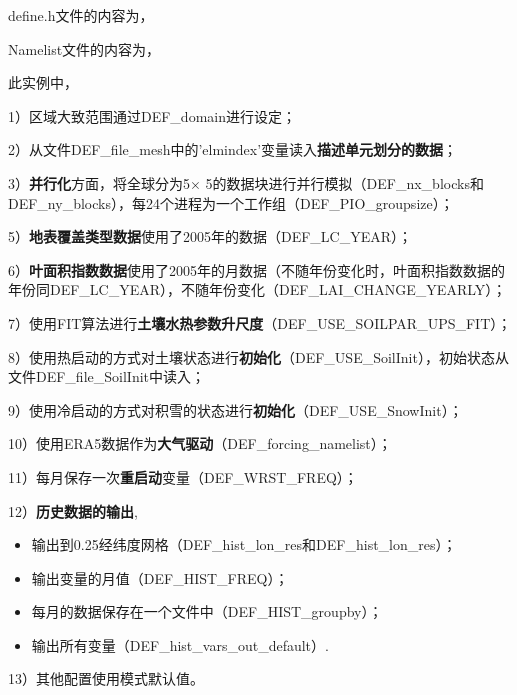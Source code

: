 \documentclass[a4paper,12pt,twoside]{article}
\begin{document}
define.h文件的内容为，


Namelist文件的内容为，


此实例中，\par
1）区域大致范围通过DEF\_domain进行设定；\par
2）从文件DEF\_file\_mesh中的'elmindex'变量读入\textbf{描述单元划分的数据}；\par
3）\textbf{并行化}方面，将全球分为5\textdegree$\times$ 5\textdegree 的数据块进行并行模拟（DEF\_nx\_blocks和DEF\_ny\_blocks），每24个进程为一个工作组（DEF\_PIO\_groupsize）；\par
5）\textbf{地表覆盖类型数据}使用了2005年的数据（DEF\_LC\_YEAR）；\par
6）\textbf{叶面积指数数据}使用了2005年的月数据（不随年份变化时，叶面积指数数据的年份同DEF\_LC\_YEAR），不随年份变化（DEF\_LAI\_CHANGE\_YEARLY）；\par
7）使用FIT算法进行\textbf{土壤水热参数升尺度}（DEF\_USE\_SOILPAR\_UPS\_FIT）；\par
8）使用热启动的方式对土壤状态进行\textbf{初始化}（DEF\_USE\_SoilInit），初始状态从文件DEF\_file\_SoilInit中读入；\par
9）使用冷启动的方式对积雪的状态进行\textbf{初始化}（DEF\_USE\_SnowInit）；\par
10）使用ERA5数据作为\textbf{大气驱动}（DEF\_forcing\_namelist）；\par
11）每月保存一次\textbf{重启动}变量（DEF\_WRST\_FREQ）；\par
12）\textbf{历史数据的输出},
\begin{itemize}[nosep,leftmargin=4em]
    \item 输出到0.25\textdegree 经纬度网格（DEF\_hist\_lon\_res和DEF\_hist\_lon\_res）；
    \item 输出变量的月值（DEF\_HIST\_FREQ）；
    \item 每月的数据保存在一个文件中（DEF\_HIST\_groupby）；
    \item 输出所有变量（DEF\_hist\_vars\_out\_default）.
\end{itemize}\par
13）其他配置使用模式默认值。
\end{document}
